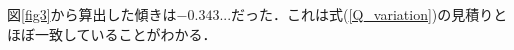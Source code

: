 \documentclass[10.5pt,a4paper]{jreport}
\begin{document}
図\ref{fig3}から算出した傾きは$-0.343...$だった．これは式(\ref{Q_variation})の見積りとほぼ一致していることがわかる．

\newpage
\end{document}
